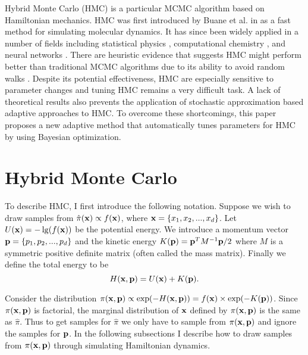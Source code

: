 \documentclass{article} %
\begin{document}
Hybrid Monte Carlo (HMC) is a particular MCMC algorithm based on Hamiltonian mechanics. HMC was first introduced by Buane et al. in \cite{duane1987hybrid} as a fast method for simulating molecular dynamics. It has since been widely applied in a number of fields including statistical physics \cite{gupta1988tuning, sexton1992hamiltonian}, computational chemistry \cite{hansmann1996molecular, tuckerman1993efficient}, and neural networks \cite{zlochin2001manifold, neal1996bayesian}. There are heuristic evidence that suggests HMC might perform better than traditional MCMC algorithms due to its ability to avoid random walks \cite{chen2001exploring, neal2010mcmc}. Despite its potential effectiveness, HMC are especially sensitive to parameter changes and tuning HMC remains a very difficult task. A lack of theoretical results also prevents the application of stochastic approximation based adaptive approaches to HMC. To overcome these shortcomings, this paper proposes a new adaptive method that automatically tunes parameters for HMC by using Bayesian optimization. 




\section{Hybrid Monte Carlo}
To describe HMC, I first introduce the following notation. Suppose we wish to draw samples from $\hat{\pi}({\bf x}) \propto f({\bf x})$, where ${\bf x} = \{x_{1}, x_{2},...,x_{d}\}$. Let $U({\bf x}) =  -\lg(f({\bf x}))$ be the potential energy. We introduce a momentum vector ${\bf p} = \{p_{1}, p_{2},...,p_{d}\}$ and the kinetic energy $K({\bf p}) = {\bf p}^{T}M^{-1}{\bf p}/2$ where $M$ is a symmetric positive definite matrix (often called the mass matrix). Finally we define the total energy to be 
\begin{equation}
H({\bf x}, {\bf p}) = U({\bf x}) + K({\bf p}).  
\end{equation}

Consider the distribution $\pi({\bf x}, {\bf p}) \propto \exp(-H({\bf x}, {\bf p})) = f({\bf x})\times\exp(-K({\bf p}))$. Since $\pi({\bf x}, {\bf p})$ is factorial, the marginal distribution of ${\bf x}$ defined by $\pi({\bf x}, {\bf p})$ is the same as $\hat{\pi}$. Thus to get samples for $\hat{\pi}$ we only have to sample from $\pi({\bf x}, {\bf p})$ and ignore the samples for ${\bf p}$. In the following subsections I describe how to draw samples from $\pi({\bf x}, {\bf p})$ through simulating Hamiltonian dynamics.
\end{document}
